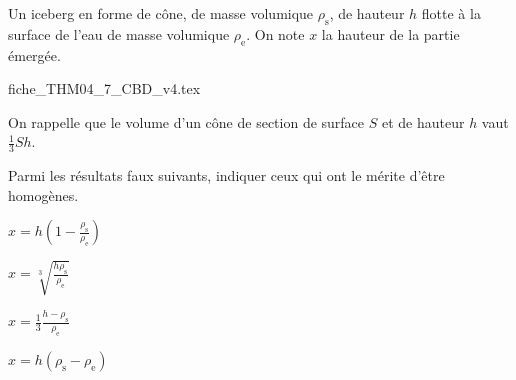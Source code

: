 Un iceberg en forme de cône, de masse volumique $\rho_\text{s}$, de hauteur $h$ flotte à la surface de l'eau de masse volumique $\rho_\text{e}$. On note $x$ la hauteur de la partie émergée.


\def\ratioScaleImage{1.3}
\begin{center}
{fiche_THM04_7_CBD_v4.tex}
\end{center}

On rappelle que le volume d'un cône de section de surface $S$ et de hauteur $h$ vaut $\frac{1}{3} Sh$.


\debutEntrainement


\begin{enonce}
Parmi les résultats faux suivants, indiquer ceux qui ont le mérite d'être homogènes.

\begin{listeQCM2Colonnes}
	\item $x=h\left(1-\frac{\rho_\text{s}}{\rho_\text{e}}\right)$
	\item $x=\sqrt[3]{\frac{h\rho_\text{s}}{\rho_\text{e}}}$
	\item $x=\frac13 \frac{h-\rho_\text{s}}{\rho_\text{e}}$
	\item $x=h\left(\rho_\text{s}-\rho_\text{e}\right)$
	\end{listeQCM2Colonnes}
\end{enonce}

